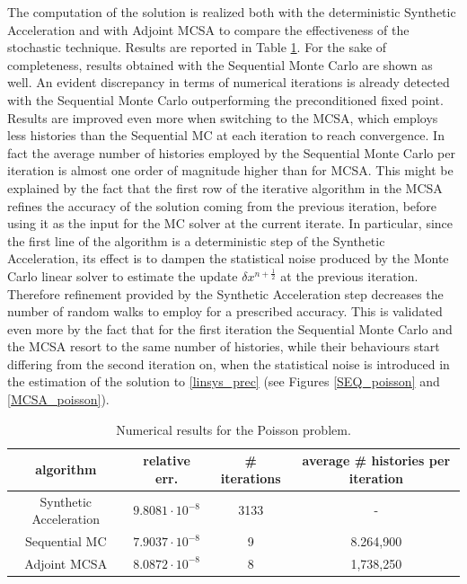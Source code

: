 \documentclass[a4paper,10pt]{article}
\begin{document}
The computation of the solution is realized both with the deterministic
Synthetic Acceleration and with Adjoint MCSA to compare the effectiveness of
the
stochastic technique. Results are reported in Table
\ref{Poisson_results}. For the sake of completeness, results obtained with
the Sequential Monte Carlo are shown as well. An evident discrepancy in terms
of numerical iterations
is already detected with the Sequential Monte Carlo outperforming the
preconditioned fixed point. Results are improved even more
when
switching to the MCSA, which employs less histories than the Sequential MC at
each iteration to
reach convergence. In fact the average number of histories employed by the
Sequential
Monte Carlo per iteration is almost one order of magnitude higher than for
MCSA. This
might be explained by the fact that the first row of the iterative algorithm in
the MCSA refines the accuracy of the solution coming from the previous
iteration,
before using it as the input for the MC solver at the current iterate.
In particular, since the first line of the algorithm is a deterministic step of
the Synthetic Acceleration, its effect is to dampen the statistical noise
produced by the Monte Carlo linear solver to estimate the update $\delta
x^{n + \frac{1}{2}}$ at the previous iteration. Therefore
refinement provided by the Synthetic Acceleration step decreases the number of
random walks
to employ for a prescribed accuracy. This is validated even more by the fact
that for the first iteration the Sequential Monte Carlo and the MCSA resort to
the same number of histories, while their behaviours start differing from the
second iteration on, when the statistical noise is introduced in the estimation
of the solution to \ref{linsys_prec} (see Figures \ref{SEQ_poisson} and
\ref{MCSA_poisson}).


\begin{table}[!h]
\centering
\hspace*{-0.8cm}
\begin{tabular}{|c|c|c|c|}
\hline
algorithm & relative err.& \# iterations & average \# histories per iteration\\
\hline
Synthetic Acceleration & $9.8081\cdot 10^{-8}$ & 3133 & - \\
\hline
Sequential MC & $7.9037 \cdot 10^{-8}$ & 9 & 8.264,900\\
\hline
 Adjoint MCSA & $8.0872\cdot 10^{-8}$ & 8 & 1,738,250\\
\hline
\end{tabular}
\caption{Numerical results for the Poisson problem.}
\label{Poisson_results}
\end{table}
\end{document}
